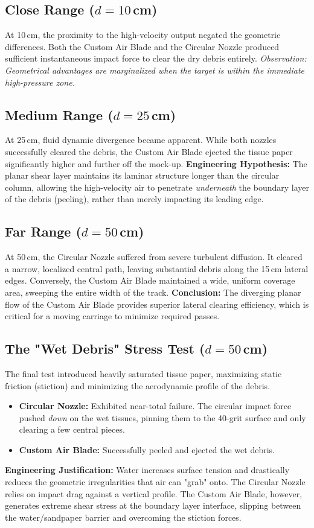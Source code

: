 \documentclass{article}
\begin{document}
\subsection{Close Range ($d = 10\,$cm)}
At 10\,cm, the proximity to the high-velocity output negated the geometric differences. Both the Custom Air Blade and the Circular Nozzle produced sufficient instantaneous impact force to clear the dry debris entirely. \textit{Observation: Geometrical advantages are marginalized when the target is within the immediate high-pressure zone.}

\subsection{Medium Range ($d = 25\,$cm)}
At 25\,cm, fluid dynamic divergence became apparent. While both nozzles successfully cleared the debris, the Custom Air Blade ejected the tissue paper significantly higher and further off the mock-up. 
\textbf{Engineering Hypothesis:} The planar shear layer maintains its laminar structure longer than the circular column, allowing the high-velocity air to penetrate \textit{underneath} the boundary layer of the debris (peeling), rather than merely impacting its leading edge. 

\subsection{Far Range ($d = 50\,$cm)}
At 50\,cm, the Circular Nozzle suffered from severe turbulent diffusion. It cleared a narrow, localized central path, leaving substantial debris along the 15\,cm lateral edges. Conversely, the Custom Air Blade maintained a wide, uniform coverage area, sweeping the entire width of the track. 
\textbf{Conclusion:} The diverging planar flow of the Custom Air Blade provides superior lateral clearing efficiency, which is critical for a moving carriage to minimize required passes.

\subsection{The "Wet Debris" Stress Test ($d = 50\,$cm)}
The final test introduced heavily saturated tissue paper, maximizing static friction (stiction) and minimizing the aerodynamic profile of the debris. 
\begin{itemize}
    \item \textbf{Circular Nozzle:} Exhibited near-total failure. The circular impact force pushed \textit{down} on the wet tissues, pinning them to the 40-grit surface and only clearing a few central pieces.
    \item \textbf{Custom Air Blade:} Successfully peeled and ejected the wet debris. 
\end{itemize}
\textbf{Engineering Justification:} Water increases surface tension and drastically reduces the geometric irregularities that air can "grab" onto. The Circular Nozzle relies on impact drag against a vertical profile. The Custom Air Blade, however, generates extreme shear stress at the boundary layer interface, slipping between the water/sandpaper barrier and overcoming the stiction forces. 
\end{document}
